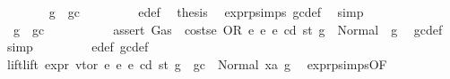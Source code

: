 \begin{isabellebody}
\ \ \ \ \ \ \isamarkupfalse%
\ {\isachardoublequoteopen}g\ {\isasymle}\ gc{\isachardoublequoteclose}\isanewline
\ \ \ \ \ \ \isamarkupfalse%
\ {}{}{\isacharparenleft}{\kern0pt}{}{\isacharparenright}{\kern0pt}\ e{\isacharunderscore}{\kern0pt}def\ \isamarkupfalse%
\ {\isacharquery}{\kern0pt}thesis\ \isamarkupfalse%
\ expr{\isachardot}{\kern0pt}psimps{\isacharparenleft}{\kern0pt}{}{}{\isacharparenright}{\kern0pt}\ gc{\isacharunderscore}{\kern0pt}def\ \isamarkupfalse%
\ simp\isanewline
\ \ \ \ \isamarkupfalse%
\isanewline
\ \ \ \ \ \ \isamarkupfalse%
\ {\isachardoublequoteopen}{\isasymnot}\ g\ {\isasymle}\ gc{\isachardoublequoteclose}\isanewline
\ \ \ \ \ \ \isamarkupfalse%
\ \isamarkupfalse%
\ {\isacharasterisk}{\kern0pt}{\isacharcolon}{\kern0pt}\ {\isachardoublequoteopen}assert\ Gas\ {\isacharparenleft}{\kern0pt}{\isacharparenleft}{\kern0pt}{\isacharless}{\kern0pt}{\isacharparenright}{\kern0pt}\ {\isacharparenleft}{\kern0pt}costs\isactrlsub e\ {\isacharparenleft}{\kern0pt}OR\ e{}\ e{}{\isacharparenright}{\kern0pt}\ e\ cd\ st{\isacharparenright}{\kern0pt}{\isacharparenright}{\kern0pt}\ g\ {\isacharequal}{\kern0pt}\ Normal\ {\isacharparenleft}{\kern0pt}{\isacharparenleft}{\kern0pt}{\isacharparenright}{\kern0pt}{\isacharcomma}{\kern0pt}\ g{\isacharparenright}{\kern0pt}{\isachardoublequoteclose}\ \isamarkupfalse%
\ gc{\isacharunderscore}{\kern0pt}def\ \isamarkupfalse%
\ simp\isanewline
\ \ \ \ \ \ \isamarkupfalse%
\ {}{}{\isacharparenleft}{\kern0pt}{}{\isacharparenright}{\kern0pt}\ e{\isacharunderscore}{\kern0pt}def\ gc{\isacharunderscore}{\kern0pt}def\ \isamarkupfalse%
\ lift{\isacharcolon}{\kern0pt}{\isachardoublequoteopen}lift\ expr\ vtor\ e{}\ e{}\ e\ cd\ st\ {\isacharparenleft}{\kern0pt}g\ {\isacharminus}{\kern0pt}\ gc{\isacharparenright}{\kern0pt}\ {\isacharequal}{\kern0pt}\ Normal\ {\isacharparenleft}{\kern0pt}xa{\isacharcomma}{\kern0pt}\ g{}{\isacharparenright}{\kern0pt}{\isachardoublequoteclose}\ \isamarkupfalse%
\ expr{\isachardot}{\kern0pt}psimps{\isacharparenleft}{\kern0pt}{}{}{\isacharparenright}{\kern0pt}{\isacharbrackleft}{\kern0pt}OF\ {}{}{\isacharparenleft}{\kern0pt}{}{\isacharparenright}{\kern0pt}{\isacharbrackright}{\kern0pt}\ \isamarkupfalse%

\end{isabellebody}
